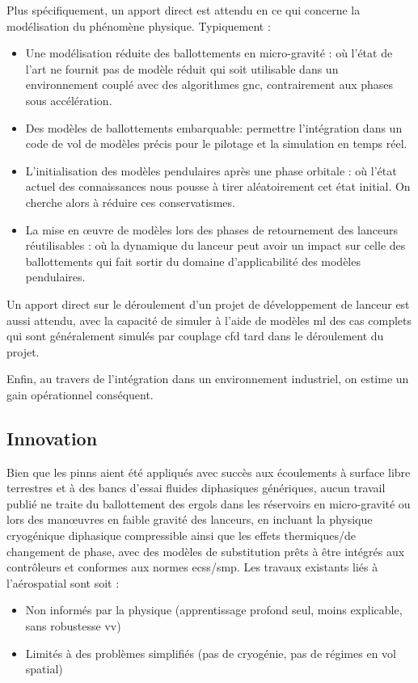 \documentclass[12pt]{article}
\begin{document}
	Plus spécifiquement, un apport direct est attendu en ce qui concerne la modélisation du phénomène physique. Typiquement :
	\begin{itemize}
		\item Une modélisation réduite des ballottements en micro-gravité : où l'état de l'art ne fournit pas de modèle réduit qui soit utilisable dans un environnement couplé avec des algorithmes \acrshort{gnc}, contrairement aux phases sous accélération.
		\item Des modèles de ballottements embarquable: permettre l'intégration dans un code de vol de modèles précis pour le pilotage et la simulation en temps réel.
		\item L'initialisation des modèles pendulaires après une phase orbitale : où l'état actuel des connaissances nous pousse à tirer aléatoirement cet état initial. On cherche alors à réduire ces conservatismes.
		\item La mise en œuvre de modèles lors des phases de retournement des lanceurs réutilisables : où la dynamique du lanceur peut avoir un impact sur celle des ballottements qui fait sortir du domaine d'applicabilité des modèles pendulaires.
	\end{itemize}
	Un apport direct sur le déroulement d'un projet de développement de lanceur est aussi attendu, avec la capacité de simuler à l'aide de modèles \acrshort{ml} des cas complets qui sont généralement simulés par couplage \acrshort{cfd} tard dans le déroulement du projet.
	
	Enfin, au travers de l'intégration dans un environnement industriel, on estime un gain opérationnel conséquent.
	
	\subsection*{Innovation}
	
	Bien que les \gls{pinn}s aient été appliqués avec succès aux écoulements à surface libre terrestres et à des bancs d’essai fluides diphasiques génériques, aucun travail publié ne traite du ballottement des ergols dans les réservoirs en micro-gravité ou lors des manœuvres en faible gravité des lanceurs, en incluant la physique cryogénique diphasique compressible ainsi que les effets thermiques/de changement de phase, avec des modèles de substitution prêts à être intégrés aux contrôleurs et conformes aux normes \acrshort{ecss}/\acrshort{smp}.
	Les travaux existants liés à l’aérospatial sont soit :
	
	\begin{itemize}
		\item Non informés par la physique (apprentissage profond seul, moins explicable, sans robustesse \acrshort{vv})
		\item Limités à des problèmes simplifiés (pas de cryogénie, pas de régimes en vol spatial)
	\end{itemize}
	
\end{document}
